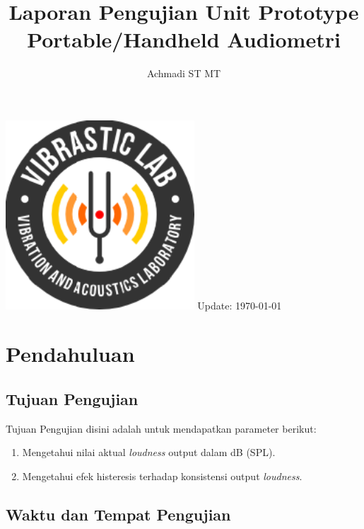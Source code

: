 \documentclass[12pt,]{article}
\title{\LARGE \bf
	Laporan Pengujian Unit Prototype Portable/Handheld Audiometri\\
}
\author{Achmadi ST MT}
\date{}
\begin{document}
	\thispagestyle{empty}

	\begin{titlepage}
		\centering
		\vfill
		\vfill
		\maketitle
		\vfill
		\includegraphics[width=200pt]{images/logo/logoviblab}
		\vfill
		\vfill
		Update: {\today} \currenttime \\
	\end{titlepage}


	\newpage
	\tableofcontents


	\newpage
	\section{Pendahuluan}

	\subsection{Tujuan Pengujian}

	Tujuan Pengujian disini adalah untuk mendapatkan parameter berikut:
	\begin{enumerate}
		\item Mengetahui nilai aktual \textit{loudness} output dalam dB (SPL).
		\item Mengetahui efek histeresis terhadap konsistensi output \textit{loudness}.
	\end{enumerate}

	\subsection{Waktu dan Tempat Pengujian}
\end{document}
